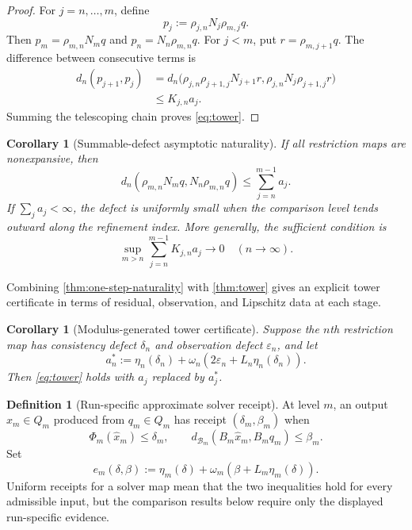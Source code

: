 \documentclass[11pt]{article}
\newtheorem{corollary}[theorem]{Corollary}
\theoremstyle{definition}
\newtheorem{definition}[theorem]{Definition}
\theoremstyle{remark}
\numberwithin{equation}{section}
\newcommand{\cB}{\mathcal B}
\newcommand{\eps}{\varepsilon}
\begin{document}
\begin{proof}
For $j=n,\dots,m$, define
\[
 p_j:=\rho_{j,n}N_j\rho_{m,j}q.
\]
Then $p_m=\rho_{m,n}N_mq$ and $p_n=N_n\rho_{m,n}q$.  For $j<m$, put $r=\rho_{m,j+1}q$.  The difference between consecutive terms is
\begin{align*}
 d_n(p_{j+1},p_j)
 &=d_n\bigl(
 \rho_{j,n}\rho_{j+1,j}N_{j+1}r,
 \rho_{j,n}N_j\rho_{j+1,j}r
 \bigr)\\
 &\le K_{j,n}a_j.
\end{align*}
Summing the telescoping chain proves \eqref{eq:tower}.
\end{proof}

\begin{corollary}[Summable-defect asymptotic naturality]\label{cor:summable}
If all restriction maps are nonexpansive, then
\[
 d_n(\rho_{m,n}N_mq,N_n\rho_{m,n}q)
 \le\sum_{j=n}^{m-1}a_j.
\]
If $\sum_ja_j<\infty$, the defect is uniformly small when the comparison
level tends outward along the refinement index.  More generally, the
sufficient condition is
\[
 \sup_{m>n}\sum_{j=n}^{m-1}K_{j,n}a_j\longrightarrow0
 \quad(n\to\infty).
\]
\end{corollary}

Combining \cref{thm:one-step-naturality} with \cref{thm:tower} gives an explicit tower certificate in terms of residual, observation, and Lipschitz data at each stage.

\begin{corollary}[Modulus-generated tower certificate]\label{cor:modulus-tower}
Suppose the $n$th restriction map has consistency defect $\delta_n$ and observation defect $\eps_n$, and let
\[
 a_n^*:=\eta_n(\delta_n)+
 \omega_n\!\left(2\eps_n+L_n\eta_n(\delta_n)\right).
\]
Then \eqref{eq:tower} holds with $a_j$ replaced by $a_j^*$.
\end{corollary}

\begin{definition}[Run-specific approximate solver receipt]
At level $m$, an output $\widehat x_m\in Q_m$ produced from
$q_m\in Q_m$ has receipt $(\delta_m,\beta_m)$ when
\[
 \Phi_m(\widehat x_m)\le\delta_m,
 \qquad
 d_{\cB_m}(B_m\widehat x_m,B_mq_m)\le\beta_m.
\]
Set
\[
 e_m(\delta,\beta)
 :=
 \eta_m(\delta)+
 \omega_m\!\left(\beta+L_m\eta_m(\delta)\right).
\]
Uniform receipts for a solver map mean that the two inequalities hold for
every admissible input, but the comparison results below require only the
displayed run-specific evidence.
\end{definition}
\end{document}
